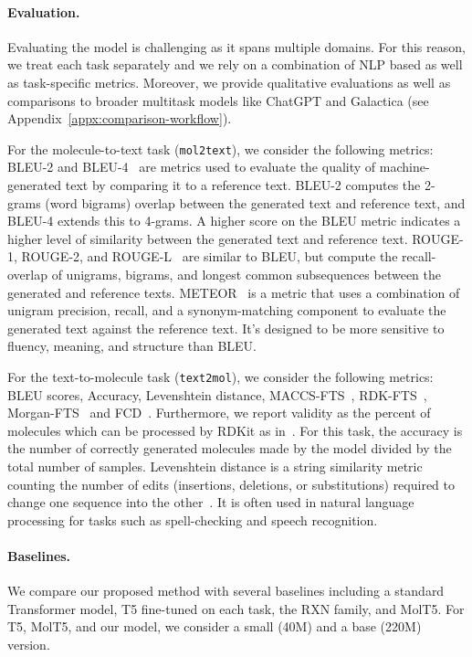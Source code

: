 \documentclass[nohyperref]{article}
\theoremstyle{plain}
\theoremstyle{definition}
\theoremstyle{remark}
\begin{document}
\paragraph{Evaluation.}
Evaluating the model is challenging as it spans multiple domains. For this reason, we treat each task separately and we rely on a combination of NLP based as well as task-specific metrics.
Moreover, we provide qualitative evaluations as well as comparisons to broader multitask models like ChatGPT and Galactica (see Appendix~\ref{appx:comparison-workflow}).

For the molecule-to-text task (\texttt{mol2text}), we consider the following metrics:
BLEU-2 and BLEU-4~\citep{papineni2002bleu} are metrics used to evaluate the quality of machine-generated text by comparing it to a reference text. BLEU-2 computes the 2-grams (word bigrams) overlap between the generated text and reference text, and BLEU-4 extends this to 4-grams. A higher score on the BLEU metric indicates a higher level of similarity between the generated text and reference text.
ROUGE-1, ROUGE-2, and ROUGE-L~\citep{lin2004rouge} are similar to BLEU, but compute the recall-overlap of unigrams, bigrams, and longest common subsequences between the generated and reference texts.
METEOR~\citep{banerjee-lavie-2005-meteor} is a metric that uses a combination of unigram precision, recall, and a synonym-matching component to evaluate the generated text against the reference text.
It's designed to be more sensitive to fluency, meaning, and structure than BLEU.

For the text-to-molecule task (\texttt{text2mol}), we consider the following metrics:
BLEU scores, Accuracy, Levenshtein distance, MACCS-FTS~\citep{durant2002reoptimization}, RDK-FTS~\citep{tanimoto1958}, Morgan-FTS~\citep{rogers2010extended} and FCD~\citep{preuer2018frechet}. Furthermore, we report validity as the percent of molecules which can be processed by RDKit as in~\citet{ edwards2022translation}.
For this task, the accuracy is the number of correctly generated molecules made by the model divided by the total number of samples.
Levenshtein distance is a string similarity metric counting the number of edits (insertions, deletions, or substitutions) required to change one sequence into the other~\citep{levenshtein1966binary}. 
It is often used in natural language processing for tasks such as spell-checking and speech recognition.

\paragraph{Baselines.}
We compare our proposed method with several baselines including a standard Transformer model, T5 fine-tuned on each task, the RXN family, and MolT5. For T5, MolT5, and our model, we consider a small (40M) and a base (220M) version.
\end{document}
